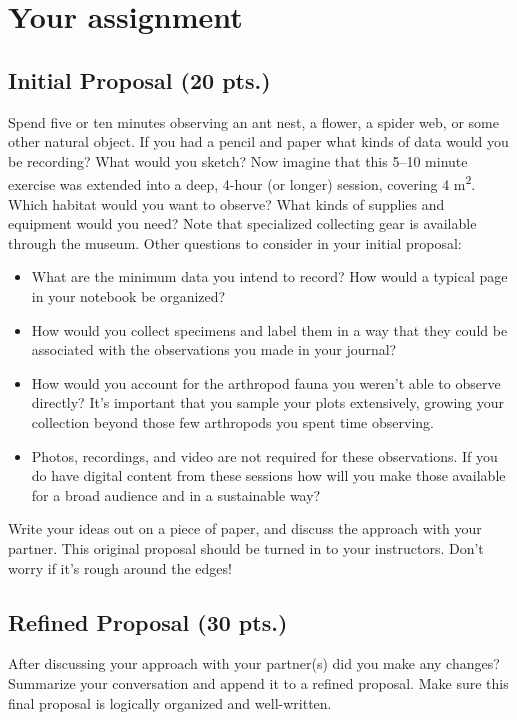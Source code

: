 \documentclass[letterpaper, 11pt]{article}
\begin{document}
\section*{Your assignment}

\subsection*{Initial Proposal (20 pts.)}
Spend five or ten minutes observing an ant nest, a flower, a spider web, or some other natural object. If you had a pencil and paper what kinds of data would you be recording? What would you sketch? Now imagine that this 5--10 minute exercise was extended into a deep, 4-hour (or longer) session, covering 4 m\textsuperscript{2}. Which habitat would you want to observe? What kinds of supplies and equipment would you need? Note that specialized collecting gear is available through the museum. Other questions to consider in your initial proposal:
\begin{itemize}
\item What are the minimum data you intend to record? How would a typical page in your notebook be organized?
\item How would you collect specimens and label them in a way that they could be associated with the observations you made in your journal? 
\item How would you account for the arthropod fauna you weren't able to observe directly? It's important that you sample your plots extensively, growing your collection beyond those few arthropods you spent time observing.
\item Photos, recordings, and video are not required for these observations. If you do have digital content from these sessions how will you make those available for a broad audience and in a sustainable way?
\end{itemize}

\noindent{}Write your ideas out on a piece of paper, and discuss the approach with your partner. This original proposal should be turned in to your instructors. Don't worry if it's rough around the edges!

\subsection*{Refined Proposal (30 pts.)}
After discussing your approach with your partner(s) did you make any changes? Summarize your conversation and append it to a refined proposal. Make sure this final proposal is logically organized and well-written.
\end{document}
